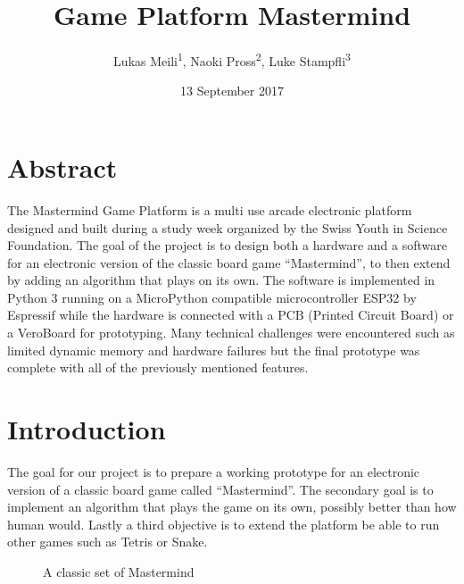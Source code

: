 \documentclass[a4paper, 12pt]{article}
\title{Game Platform Mastermind}
\author{%
    Lukas Meili\textsuperscript{1}, %
    Naoki Pross\textsuperscript{2}, %
    Luke Stampfli\textsuperscript{3}
}
\date{13 September 2017}
\begin{document}
\maketitle

\setlength{\parskip}{2pt} 

\section*{Abstract}
The Mastermind Game Platform is a multi use arcade electronic platform
designed and built during a study week organized by  the Swiss Youth in
Science Foundation. The goal of the project is to design both a hardware
and a software for an electronic version of the classic board game
“Mastermind”, to then extend by adding an algorithm that plays on its
own. The software is implemented in Python 3 running on a MicroPython
compatible microcontroller ESP32 by Espressif while the hardware is
connected with a PCB (Printed Circuit Board) or a VeroBoard for prototyping.
Many technical challenges were encountered such as limited dynamic
memory and hardware failures but the final prototype was complete with
all of  the previously mentioned features.


\section{Introduction}
The goal for our project is to prepare a working prototype for an
electronic version of a classic board game called “Mastermind”. The
secondary goal is to implement an algorithm that plays the game on its
own, possibly better than how human would. Lastly a third objective is
to extend the platform be able to run other games such as Tetris or
Snake.
\begin{figure}
    \caption{A classic set of Mastermind \cite{classicmastermind}} 
    \label{fig:mset}
    \vspace{-1.5cm}
\end{figure}
\end{document}
